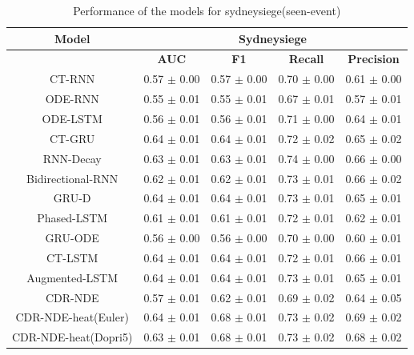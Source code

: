 \documentclass{article} %
\begin{document}
\begin{table}
        \begin{center}
                \begin{tabular}{|c|c|c|c|c|}
                        \hline
                        {\small \textbf{Model}}  & \multicolumn{4}{c|}{\textbf{Sydneysiege} } \\
                        \hline
                         & \textbf{AUC }& \textbf{F1} & \textbf{Recall} & \textbf{Precision} \\
                         \hline
                        CT-RNN & 0.57 $\pm$ 0.00 & 0.57 $\pm$ 0.00 & 0.70 $\pm$ 0.00 & 0.61 $\pm$ 0.00 \\
                        ODE-RNN & 0.55 $\pm$ 0.01 & 0.55 $\pm$ 0.01 & 0.67 $\pm$ 0.01 & 0.57 $\pm$ 0.01 \\
                        ODE-LSTM & 0.56 $\pm$ 0.01 & 0.56 $\pm$ 0.01 & 0.71 $\pm$ 0.00 & 0.64 $\pm$ 0.01 \\
                        CT-GRU & 0.64 $\pm$ 0.01 & 0.64 $\pm$ 0.01 & 0.72 $\pm$ 0.02 & 0.65 $\pm$ 0.02 \\
                        RNN-Decay & 0.63 $\pm$ 0.01 & 0.63 $\pm$ 0.01 & 0.74 $\pm$ 0.00 & 0.66 $\pm$ 0.00 \\
                        Bidirectional-RNN & 0.62 $\pm$ 0.01 & 0.62 $\pm$ 0.01 & 0.73 $\pm$ 0.01 & 0.66 $\pm$ 0.02 \\
                        GRU-D & 0.64 $\pm$ 0.01 & 0.64 $\pm$ 0.01 & 0.73 $\pm$ 0.01 & 0.65 $\pm$ 0.01 \\
                        Phased-LSTM & 0.61 $\pm$ 0.01 & 0.61 $\pm$ 0.01 & 0.72 $\pm$ 0.01 & 0.62 $\pm$ 0.01 \\
                        GRU-ODE & 0.56 $\pm$ 0.00 & 0.56 $\pm$ 0.00 & 0.70 $\pm$ 0.00 & 0.60 $\pm$ 0.01 \\
                        CT-LSTM & 0.64 $\pm$ 0.01 & 0.64 $\pm$ 0.01 & 0.72 $\pm$ 0.01 & 0.66 $\pm$ 0.01 \\
                        Augmented-LSTM & 0.64 $\pm$ 0.01 & 0.64 $\pm$ 0.01 & 0.73 $\pm$ 0.01 & 0.65 $\pm$ 0.01 \\
                        \hline
                        CDR-NDE & 0.57 $\pm$ 0.01 & 0.62 $\pm$ 0.01 & 0.69 $\pm$ 0.02 & 0.64 $\pm$ 0.05 \\ 
CDR-NDE-heat(Euler) & 0.64 $\pm$ 0.01 & 0.68 $\pm$ 0.01 & 0.73 $\pm$ 0.02 & 0.69 $\pm$ 0.02 \\ 
CDR-NDE-heat(Dopri5) & 0.63 $\pm$ 0.01 & 0.68 $\pm$ 0.01 & 0.73 $\pm$ 0.02 & 0.68 $\pm$ 0.02 \\ \hline 
                \end{tabular}
        \end{center}
        \caption{Performance of the models for sydneysiege(seen-event)}
         \label{tab:sydneysiege}
\end{table}
\end{document}
